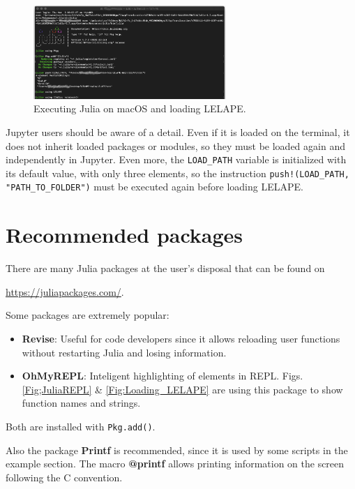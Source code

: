 \begin{figure}
	\centering
	\includegraphics[width=0.65\textwidth]{fig/Julia_in_macOS_anonymous}
	\caption{Executing Julia on macOS and loading LELAPE.}
	\label{Fig:Julia_in_macos}
\end{figure}

Jupyter users should be aware of a detail. Even if it is loaded on the terminal, it does not inherit loaded packages or modules, so they must be loaded again and independently in Jupyter. Even more, the \texttt{LOAD\_PATH} variable is initialized with its default value, with only three elements, so the instruction \texttt{push!(LOAD\_PATH, "PATH\_TO\_FOLDER")} must be executed again before loading LELAPE.

\section{Recommended packages}
%
There are many Julia packages at the user's disposal that can be found on

\begin{center}
	\href{https://juliapackages.com/}{https://juliapackages.com/}.
\end{center}  

Some packages are extremely popular:
\begin{itemize}
	\item \textbf{Revise}: Useful for code developers since it allows reloading user functions without restarting Julia and losing information.
	\item \textbf{OhMyREPL}: Inteligent highlighting of elements in REPL. Figs. \ref{Fig;JuliaREPL} \& \ref{Fig:Loading_LELAPE} are using this package to show function names and strings.
\end{itemize}

Both are installed with \texttt{Pkg.add()}. \vspace{5mm}

Also the package \textbf{Printf} is recommended, since it is used by some scripts in the example section. The macro \textbf{{\makeatletter @}printf} allows printing information on the screen following the C convention.

